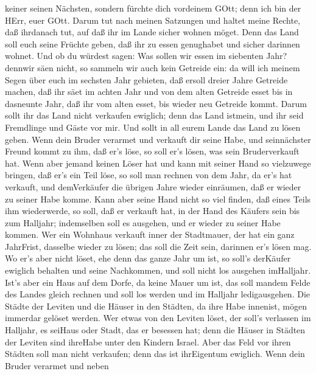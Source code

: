 keiner seinen Nächsten, sondern fürchte dich vordeinem GOtt; denn ich
bin der HErr, euer GOtt.  Darum tut nach meinen Satzungen
und haltet meine Rechte, daß ihrdanach tut, auf daß ihr im Lande sicher
wohnen möget.  Denn das Land soll euch seine Früchte geben,
daß ihr zu essen genughabet und sicher darinnen wohnet. 
Und ob du würdest sagen: Was sollen wir essen im siebenten Jahr? dennwir
säen nicht, so sammeln wir auch kein Getreide ein:  da will
ich meinem Segen über euch im sechsten Jahr gebieten, daß ersoll dreier
Jahre Getreide machen,  daß ihr säet im achten Jahr und von
dem alten Getreide esset bis in dasneunte Jahr, daß ihr vom alten esset,
bis wieder neu Getreide kommt.  Darum sollt ihr das Land
nicht verkaufen ewiglich; denn das Land istmein, und ihr seid Fremdlinge
und Gäste vor mir.  Und sollt in all eurem Lande das Land
zu lösen geben.  Wenn dein Bruder verarmet und verkauft dir
seine Habe, und seinnächster Freund kommt zu ihm, daß er's löse, so soll
er's lösen, was sein Bruderverkauft hat.  Wenn aber jemand
keinen Löser hat und kann mit seiner Hand so vielzuwege bringen, daß
er's ein Teil löse,  so soll man rechnen von dem Jahr, da
er's hat verkauft, und demVerkäufer die übrigen Jahre wieder einräumen,
daß er wieder zu seiner Habe komme.  Kann aber seine Hand
nicht so viel finden, daß eines Teils ihm wiederwerde, so soll, daß er
verkauft hat, in der Hand des Käufers sein bis zum Halljahr; indemselben
soll es ausgehen, und er wieder zu seiner Habe kommen.  Wer
ein Wohnhaus verkauft inner der Stadtmauer, der hat ein ganz JahrFrist,
dasselbe wieder zu lösen; das soll die Zeit sein, darinnen er's lösen
mag.  Wo er's aber nicht löset, ehe denn das ganze Jahr um
ist, so soll's derKäufer ewiglich behalten und seine Nachkommen, und
soll nicht los ausgehen imHalljahr.  Ist's aber ein Haus
auf dem Dorfe, da keine Mauer um ist, das soll mandem Felde des Landes
gleich rechnen und soll los werden und im Halljahr ledigausgehen.
 Die Städte der Leviten und die Häuser in den Städten, da
ihre Habe innenist, mögen immerdar gelöset werden.  Wer
etwas von den Leviten löset, der soll's verlassen im Halljahr, es
seiHaus oder Stadt, das er besessen hat; denn die Häuser in Städten der
Leviten sind ihreHabe unter den Kindern Israel.  Aber das
Feld vor ihren Städten soll man nicht verkaufen; denn das ist
ihrEigentum ewiglich.  Wenn dein Bruder verarmet und neben

